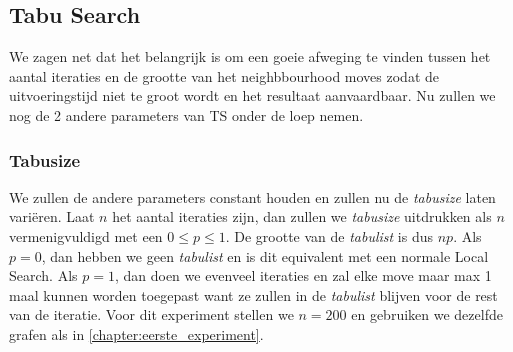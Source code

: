 \documentclass[kulak]{kulakarticle} %
\begin{document}
\subsection{Tabu Search}

We zagen net dat het belangrijk is om een goeie afweging te vinden tussen het aantal iteraties en de grootte van het neighbbourhood moves zodat de uitvoeringstijd niet te groot wordt en het resultaat aanvaardbaar. Nu zullen we nog de 2 andere parameters van TS onder de loep nemen.

\subsubsection{Tabusize} \label{chaper:tabusize}

We zullen de andere parameters constant houden en zullen nu de \textit{tabusize} laten variëren. Laat $n$ het aantal iteraties zijn, dan zullen we \textit{tabusize} uitdrukken als $n$ vermenigvuldigd met een $0 \leq p \leq 1$. De grootte van de \textit{tabulist} is dus $np$. Als $p=0$, dan hebben we geen \textit{tabulist} en is dit equivalent met een normale Local Search. Als $p=1$, dan doen we evenveel iteraties en zal elke move maar max 1 maal kunnen worden toegepast want ze zullen in de \textit{tabulist} blijven voor de rest van de iteratie. Voor dit experiment stellen we $n=200$ en gebruiken we dezelfde grafen als in \ref{chapter:eerste_experiment}. \\

\begin{table}[h]
    \centering
    \caption{Resultaten waarbij we de grootte van \textit{tabulist} laten variëren met $200p$}
    \label{tab:tabusize}
\end{table}
\end{document}
